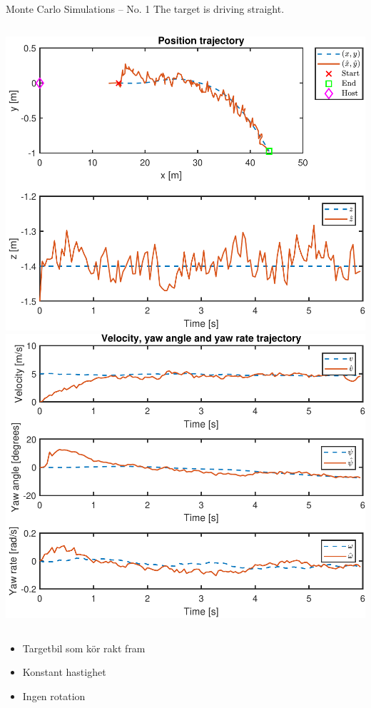 \documentclass{beamer}
\renewcommand{\o}{\"o\xspace}
\begin{document}
\begin{frame}{Monte Carlo Simulations -- No. 1}
	The target is driving straight.
	\vspace{2em}
	\begin{columns}
	\includegraphics[width=\textwidth]{Traj/20_MC_TrajPos}
	\includegraphics[width=\textwidth]{Traj/20_MC_TrajOther}
	\end{columns}

	\note
	{
		\begin{itemize}
			\item Targetbil som k\o{}r rakt fram
			\item Konstant hastighet
			\item Ingen rotation
		\end{itemize}
	}
\end{frame}
\end{document}
